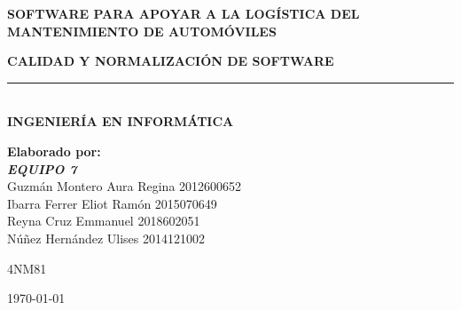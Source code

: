 \begin{titlepage}
	\vspace{1cm} %
	
	\large \textbf{SOFTWARE PARA APOYAR A LA LOGÍSTICA DEL MANTENIMIENTO DE AUTOMÓVILES}%
	
	\vspace{1cm} %
	
	\large \textbf{CALIDAD Y NORMALIZACIÓN DE SOFTWARE}\\%
	\rule{13cm}{3pt} %
	\large \textbf{\\ INGENIERÍA EN INFORMÁTICA} %
	
	\vspace{1cm} %
	
	\textbf{Elaborado por:}\\
	\vspace{0.5cm} %
	\textit \textbf{EQUIPO 7}\\
	Guzmán Montero Aura Regina \hspace{2cm} 2012600652\\
	Ibarra Ferrer Eliot Ramón \hspace {3cm} 2015070649\\ 
	Reyna Cruz Emmanuel \hspace{3.5cm} 2018602051\\
	Núñez Hernández Ulises \hspace{3.5cm} 2014121002\\

	\vspace{1cm} %
	
	4NM81
	
	\vspace{1cm} %
	
	\today
	
\end{titlepage}